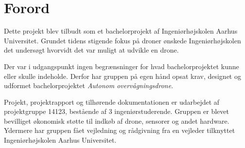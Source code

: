 \chapter{Forord}

Dette projekt blev tilbudt som et bachelorprojekt af Ingeniørhøjskolen Aarhus Universitet. Grundet tidens stigende fokus på droner ønskede Ingeniørhøjskolen det undersøgt hvorvidt det var muligt at udvikle en drone.

Der var i udgangspunkt ingen begrænsninger for hvad bachelorprojektet kunne eller skulle indeholde. Derfor har gruppen på egen hånd opsat krav, designet og udformet bachelorprojektet \textit{Autonom overvågningsdrone}.
 
Projekt, projektrapport og tilhørende dokumentationen er udarbejdet af projektgruppe 14123, bestående af 3 ingeniørstuderende. Gruppen er blevet bevilliget økonomisk støtte til indkøb af drone, sensorer og andet hardware. Ydermere har gruppen fået vejledning og rådgivning fra en vejleder tilknyttet Ingeniørhøjskolen Aarhus Universitet.  